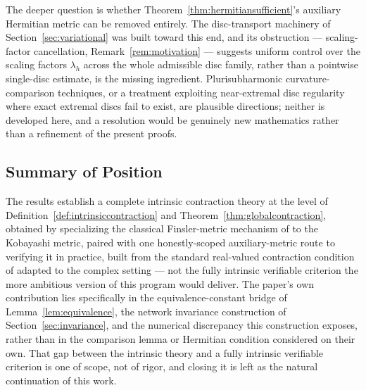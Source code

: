\documentclass[preprint,12pt,authoryear]{elsarticle}
\begin{document}
The deeper question is whether Theorem~\ref{thm:hermitiansufficient}'s auxiliary Hermitian metric can be removed entirely. The disc-transport machinery of Section~\ref{sec:variational} was built toward this end, and its obstruction --- scaling-factor cancellation, Remark~\ref{rem:motivation} --- suggests uniform control over the scaling factors $\lambda_h$ across the whole admissible disc family, rather than a pointwise single-disc estimate, is the missing ingredient. Plurisubharmonic curvature-comparison techniques, or a treatment exploiting near-extremal disc regularity where exact extremal discs fail to exist, are plausible directions; neither is developed here, and a resolution would be genuinely new mathematics rather than a refinement of the present proofs.

\subsection{Summary of Position}

The results establish a complete intrinsic contraction theory at the level of Definition~\ref{def:intrinsiccontraction} and Theorem~\ref{thm:globalcontraction}, obtained by specializing the classical Finsler-metric mechanism of \cite{forni2014differential} to the Kobayashi metric, paired with one honestly-scoped auxiliary-metric route to verifying it in practice, built from the standard real-valued contraction condition of \cite{lohmiller1998contraction} adapted to the complex setting --- not the fully intrinsic verifiable criterion the more ambitious version of this program would deliver. The paper's own contribution lies specifically in the equivalence-constant bridge of Lemma~\ref{lem:equivalence}, the network invariance construction of Section~\ref{sec:invariance}, and the numerical discrepancy this construction exposes, rather than in the comparison lemma or Hermitian condition considered on their own. That gap between the intrinsic theory and a fully intrinsic verifiable criterion is one of scope, not of rigor, and closing it is left as the natural continuation of this work.
\end{document}

